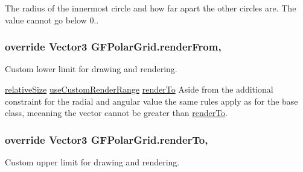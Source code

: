 The radius of the innermost circle and how far apart the other circles are. The value cannot go below 0.. \hypertarget{class_g_f_polar_grid_a9f4b9bcd687f29d56f4aafa74655e27b_a9f4b9bcd687f29d56f4aafa74655e27b}{
\subsubsection[{render\+From}]{\setlength{\rightskip}{0pt plus 5cm}override Vector3 G\+F\+Polar\+Grid.\+render\+From\hspace{0.3cm}{\ttfamily [get]}, {\ttfamily [set]}}}\label{class_g_f_polar_grid_a9f4b9bcd687f29d56f4aafa74655e27b_a9f4b9bcd687f29d56f4aafa74655e27b}
Custom lower limit for drawing and rendering.

\hyperlink{class_g_f_grid_a65d207e3957240c935645db01a199419_a65d207e3957240c935645db01a199419}{relative\+Size} \hyperlink{class_g_f_grid_acb950aa31097c85e153cd9a642900a31_acb950aa31097c85e153cd9a642900a31}{use\+Custom\+Render\+Range} \hyperlink{class_g_f_polar_grid_a81cc21991e689a1e74821d1f2870852e_a81cc21991e689a1e74821d1f2870852e}{render\+To} Aside from the additional constraint for the radial and angular value the same rules apply as for the base class, meeaning the vector cannot be greater than \hyperlink{class_g_f_polar_grid_a81cc21991e689a1e74821d1f2870852e_a81cc21991e689a1e74821d1f2870852e}{render\+To}. \hypertarget{class_g_f_polar_grid_a81cc21991e689a1e74821d1f2870852e_a81cc21991e689a1e74821d1f2870852e}{
\subsubsection[{render\+To}]{\setlength{\rightskip}{0pt plus 5cm}override Vector3 G\+F\+Polar\+Grid.\+render\+To\hspace{0.3cm}{\ttfamily [get]}, {\ttfamily [set]}}}\label{class_g_f_polar_grid_a81cc21991e689a1e74821d1f2870852e_a81cc21991e689a1e74821d1f2870852e}
Custom upper limit for drawing and rendering.

